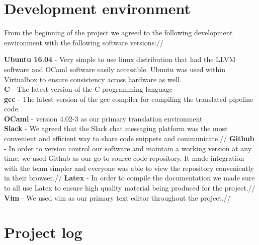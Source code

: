 \documentclass[./Report_main.tex]{subfiles}
\begin{document}
\section{Development environment}
From the beginning of the project we agreed to the following development environment with the following software versions://
\begin{adjustwidth}{1cm}{}
\textbf{Ubuntu 16.04} - Very simple to use linux distribution that had the LLVM software and OCaml
software easily accessible. Ubuntu was used within Virtualbox to ensure consistency across hardware
as well.\\
\textbf{C} - The latest version of the C programming language\\
\textbf{gcc} - The latest version of the gcc compiler for compiling the translated pipeline code.\\
\textbf{OCaml} - version 4.02-3 as our primary translation environment\\
\textbf{Slack} - We agreed that the Slack chat messaging platform was the most convenient and efficient way to share code snippets and communicate.//
\textbf{Github} - In order to version control our software and maintain a working version at any time, we used Github as our go to source code repository. It made integration with the team simpler and everyone was able to view the repository conveniently in their browser.//
\textbf{Latex} - In order to compile the documentation we made sure to all use Latex to ensure high quality material being produced for the project.//
\textbf{Vim} - We used vim as our primary text editor throughout the project.//
\end{adjustwidth}
\section{Project log}
\end{document}
